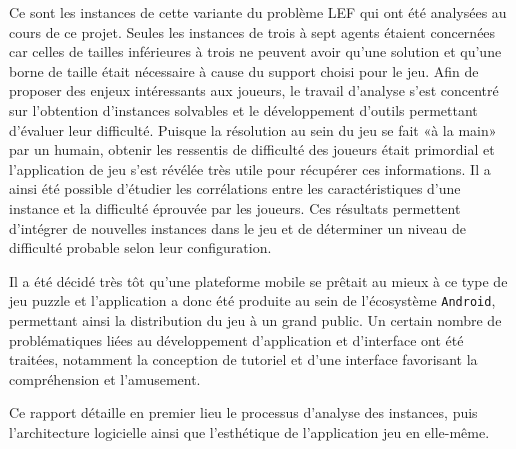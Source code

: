 \documentclass[a4paper, 11pt]{article}
\newcommand{\textquote}[1]{«#1»}
\begin{document}
    Ce sont les instances de cette variante du problème LEF qui ont été analysées au cours de ce projet. Seules les instances de trois à sept agents étaient concernées car celles de tailles inférieures à trois ne peuvent avoir qu'une solution et qu'une borne de taille était nécessaire à cause du support choisi pour le jeu. Afin de proposer des enjeux intéressants aux joueurs, le travail d'analyse s'est concentré sur l'obtention d'instances solvables et le développement d'outils permettant d'évaluer leur difficulté. Puisque la résolution au sein du jeu se fait \textquote{à la main} par un humain, obtenir les ressentis de difficulté des joueurs était primordial et l'application de jeu s'est révélée très utile pour récupérer ces informations. Il a ainsi été possible d'étudier les corrélations entre les caractéristiques d'une instance et la difficulté éprouvée par les joueurs. Ces résultats permettent d'intégrer de nouvelles instances dans le jeu et de déterminer un niveau de difficulté probable selon leur configuration.
    	
	Il a été décidé très tôt qu'une plateforme mobile se prêtait au mieux à ce type de jeu puzzle et l'application a donc été produite au sein de l'écosystème \texttt{Android}, permettant ainsi la distribution du jeu à un grand public. Un certain nombre de problématiques liées au développement d'application et d'interface ont été traitées, notamment la conception de tutoriel et d'une interface favorisant la compréhension et l'amusement.
	
	Ce rapport détaille en premier lieu le processus d'analyse des instances, puis l'architecture logicielle ainsi que l'esthétique de l'application jeu en elle-même. 
\end{document}
